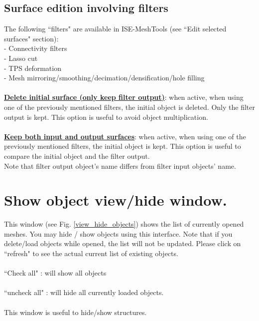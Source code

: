\subsection{Surface edition involving filters}
The following ``filters" are available in ISE-MeshTools (see ``Edit selected surfaces" section):\\
- Connectivity filters\\
- Lasso cut\\
- TPS deformation\\
- Mesh mirroring/smoothing/decimation/densification/hole filling\\\\
\noindent
\textbf{\underline{Delete initial surface (only keep filter output)}}: when active, when using one of the previously
mentioned filters, the initial object is deleted. Only the filter output is kept. This option is useful to
avoid object multiplication.\\\\
\noindent
\textbf{\underline{Keep both input and output surfaces}}: when active, when using one of the previously mentioned
filters, the initial object is kept. This option is useful to compare the initial object and the filter output.\\
Note that filter output object’s name differs from filter input objects’ name.

\section{Show object view/hide window.}
This window (see Fig. \ref{view_hide_objects}) shows the list of currently opened meshes. You may hide / show objects using this interface. Note that if
you delete/load objects while opened, the list will not be updated. Please click on ``refresh" to see the actual current
list of existing objects.\\\\
``Check all" : will show all objects\\\\
``uncheck all" : will hide all currently loaded objects.\\\\
This window is useful to hide/show structures.

